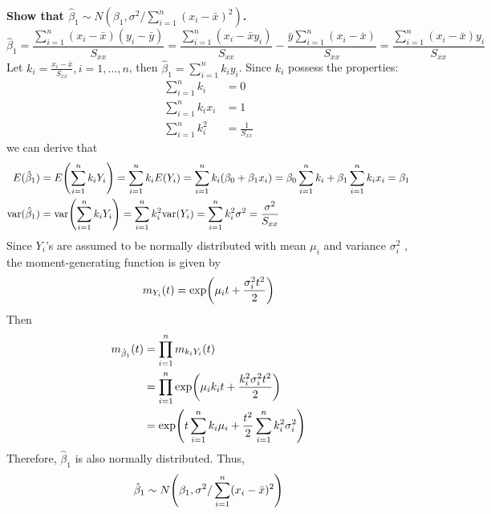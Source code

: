 \documentclass[10pt]{report}
\newcommand{\ds}{\displaystyle}
\DeclarePairedDelimiter\autoparen{(}{)}
\newcommand{\pa}[1]{\autoparen*{#1}}
\newcommand{\var}{\text{var}}
\begin{document}
{\large\bf Show that $\hat{\beta}_1 \sim N(\beta_1, \sigma^2/\sum_{i=1}^{n} (x_i - \bar{x})^2)$.}
\[
\hat{\beta}_1 = \frac{\sum_{i=1}^{n} (x_i - \bar{x})(y_i - \bar{y})}{S_{xx}} = \frac{\sum_{i=1}^{n} (x_i - \bar{x}y_i)}{S_{xx}} - \frac{\bar{y}\sum_{i=1}^{n} (x_i - \bar{x})}{S_{xx}} = \frac{\sum_{i=1}^{n} (x_i-\bar{x})y_i}{S_{xx}}
\]
Let $k_i = \frac{x_i - \bar{x}}{S_{xx}}, i=1,\dots,n$, then $\hat{\beta}_1 = \sum_{i=1}^{n} k_i y_i$. Since $k_i$ possess the properties:
\begin{align*}
	\sum_{i=1}^{n} k_i &= 0\\
	\sum_{i=1}^{n} k_i x_i &= 1\\
	\sum_{i=1}^{n} k_i^2 &= \frac{1}{S_{xx}}
\end{align*}
we can derive that
\begin{align*}
	E(\hat{\beta}_1) &= E\pa{\sum_{i=1}^{n} k_i Y_i} = \sum_{i=1}^{n} k_i E(Y_i) = \sum_{i=1}^{n} k_i (\beta_0 + \beta_1 x_i) = \beta_0 \sum_{i=1}^{n} k_i + \beta_1 \sum_{i=1}^{n} k_i x_i = \beta_1\\
	\var(\hat{\beta}_1) &= \var\pa{\sum_{i=1}^{n} k_i Y_i} = \sum_{i=1}^{n} k_i^2 \var(Y_i) = \sum_{i=1}^{n} k_i^2\sigma^2 = \frac{\sigma^2}{S_{xx}}
\end{align*}
Since $Y_i$'s are assumed to be normally distributed with mean $\mu_i$ and variance $\sigma_i^2$ , the moment-generating function is given by
\[
m_{Y_i}(t) = \exp\pa{\mu_i t + \frac{\sigma_i^2 t^2}{2}}
\]
Then
\begin{align*}
	m_{\hat{\beta}_1}(t)
	&= \prod_{i=1}^n m_{k_i Y_i}(t)\\ \ds
	&= \prod_{i=1}^n \exp\pa{\mu_i k_i t + \frac{k_i^2 \sigma_i^2 t^2}{2}}\\
	&= \exp\pa{t\sum_{i=1}^{n} k_i \mu_i + \frac{t^2}{2} \sum_{i=1}^{n} k_i^2 \sigma_i^2}
\end{align*}
Therefore, $\hat{\beta}_1$ is also normally distributed. Thus,
\[
\hat{\beta}_1 \sim N\pa{\beta_1, \sigma^2/\sum_{i=1}^{n} (x_i - \bar{x})^2}
\]
\end{document}
